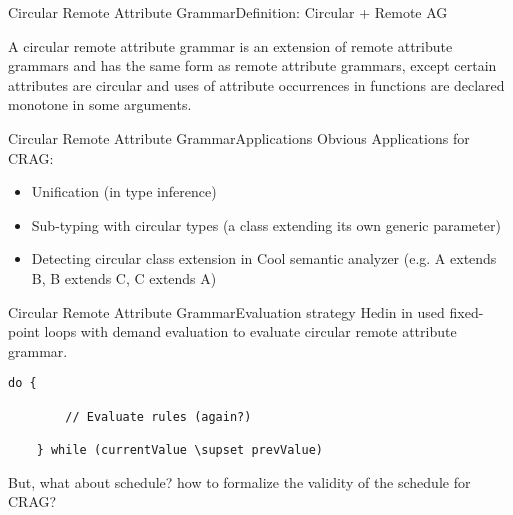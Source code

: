 \begin{frame}{Circular Remote Attribute Grammar}{Definition: Circular + Remote AG}

\begin{definition}
A circular remote attribute grammar is an \alert{extension of remote attribute grammars} and has the same form as remote attribute grammars, except \alert{certain attributes are circular} and \alert{uses of attribute occurrences in functions are declared monotone in some arguments}.
\end{definition}
\end{frame}



\begin{frame}{Circular Remote Attribute Grammar}{Applications}
Obvious Applications for CRAG:

\begin{itemize}
    \item Unification (in type inference)
	\item Sub-typing with circular types (a class extending its own generic parameter)
	\item Detecting circular class extension in Cool semantic analyzer (e.g. A extends B, B extends C, C extends A)
\end{itemize}
\end{frame}



\begin{frame}[fragile=singleslide]{Circular Remote Attribute Grammar}{Evaluation strategy}
Hedin in \cite{10.1016/j.scico.2005.06.005} used fixed-point loops with \alert{demand evaluation} to evaluate circular remote attribute grammar.

\begin{Verbatim}[fontsize=\small]
    do {
    
        // Evaluate rules (again?)
        
    } while (currentValue \supset prevValue)
\end{Verbatim}

\newlinevspace

But, what about \alert{schedule}? how to formalize the validity of the schedule for CRAG?
\end{frame}

